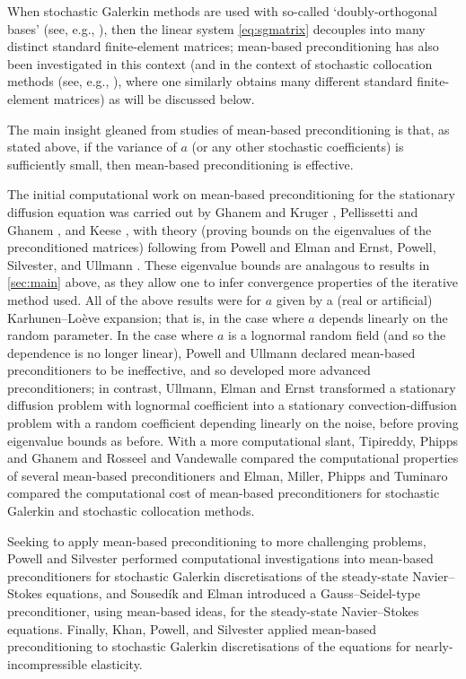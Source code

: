 When stochastic Galerkin methods are used with so-called `doubly-orthogonal bases' (see, e.g., \cite[Section 3.2]{ErPoSiUl:09}), then the linear system \cref{eq:sgmatrix} decouples into many distinct standard finite-element matrices; mean-based preconditioning has also been investigated in this context (and in the context of stochastic collocation methods (see, e.g., \cite{BaNoTe:07}), where one similarly obtains many different standard finite-element matrices) as will be discussed below.

The main insight gleaned from studies of mean-based preconditioning is that, as stated above, if the variance of $a$ (or any other stochastic coefficients) is sufficiently small, then mean-based preconditioning is effective.

The initial computational work on mean-based preconditioning for the stationary diffusion equation was carried out by Ghanem and Kruger \cite{GhKr:96}, Pellissetti and Ghanem \cite{PeGh:00}, and Keese \cite{Ke:04}, with theory (proving bounds on the eigenvalues of the preconditioned matrices) following from Powell and Elman \cite{PoEl:09} and Ernst, Powell, Silvester, and Ullmann \cite{ErPoSiUl:09}. These eigenvalue bounds are analagous to results in \cref{sec:main} above, as they allow one to infer convergence properties of the iterative method used. All of the above results were for $a$ given by a (real or artificial) Karhunen--Lo\`eve expansion; that is, in the case where $a$ depends linearly on the random parameter. In the case where $a$ is a lognormal random field (and so the dependence is no longer linear), Powell and Ullmann \cite{PoUl:10} declared mean-based preconditioners to be ineffective, and so developed more advanced preconditioners; in contrast, Ullmann, Elman and Ernst \cite{UlElEr:12} transformed a stationary diffusion problem with lognormal coefficient into a stationary convection-diffusion problem with a random coefficient depending linearly on the noise, before proving eigenvalue bounds as before. With a more computational slant, Tipireddy, Phipps and Ghanem \cite{TiPhGh:10} and Rosseel and Vandewalle \cite{RoVa:10} compared the computational properties of several mean-based preconditioners and Elman, Miller, Phipps and Tuminaro \cite{ElMiPhTu:11} compared the computational cost of mean-based preconditioners for stochastic Galerkin and stochastic collocation methods.

Seeking to apply mean-based preconditioning to more challenging problems, Powell and Silvester \cite{PoSi:12} performed computational investigations into mean-based preconditioners for stochastic Galerkin discretisations of the steady-state Navier--Stokes equations, and Soused\'ik and Elman \cite{SoEl:16} introduced a Gauss--Seidel-type preconditioner, using mean-based ideas, for the steady-state Navier--Stokes equations. Finally, Khan, Powell, and Silvester \cite{KhPoSi:19} applied mean-based preconditioning to stochastic Galerkin discretisations of the equations for nearly-incompressible elasticity.

